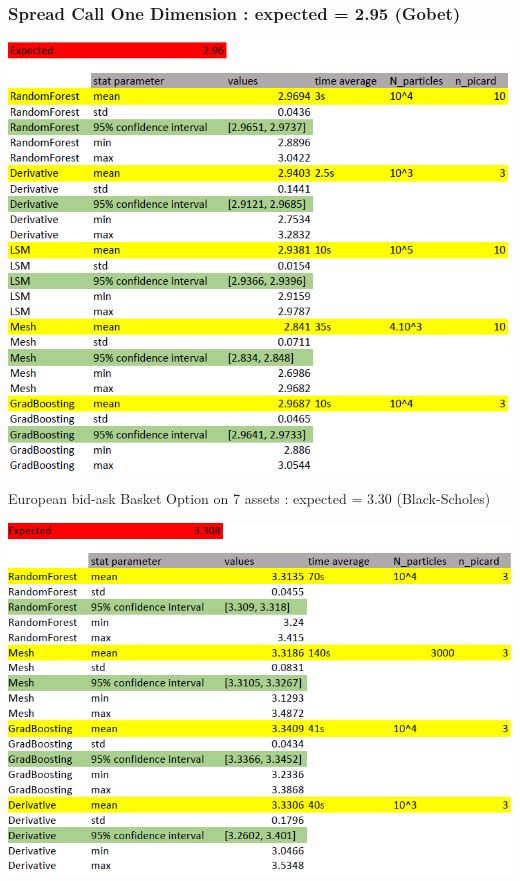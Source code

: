 \documentclass[10pt]{beamer}
\begin{document}
 

 
 
 \begin{frame}
 	\frametitle{Spread Call One Dimension : expected = 2.95 (Gobet)}
 	
 	\centering
 	\includegraphics[scale=0.4]{bid_ask_spread_1d_results.png}
 \end{frame}
 
 
\begin{frame}{European bid-ask Basket Option on 7 assets : expected = 3.30 (Black-Scholes)}
	
	
	\centering
	\includegraphics[scale=0.4]{bid_ask_call_7d.png}
	
	
\end{frame}
\end{document}
